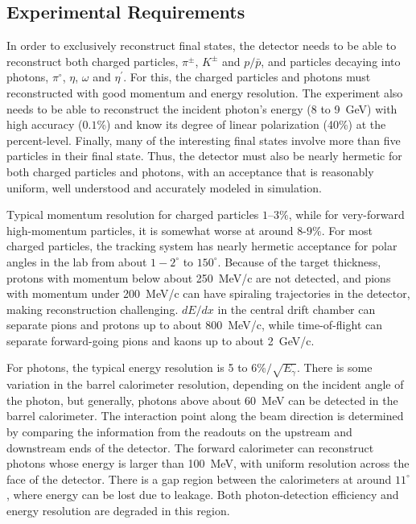 \subsection[Experimental Requirements]{Experimental Requirements \label{sec:intro:requirements}}
In order to exclusively reconstruct final states, the \gx{} detector needs to be able to reconstruct both charged particles, $\pi^{\pm}$, $K^{\pm}$ and $p/\bar{p}$, and particles decaying into photons, $\pi^{\circ}$, $\eta$, $\omega$ and $\eta^{\prime}$. For this, the charged particles and photons must reconstructed with good momentum and energy resolution. The experiment also needs to be able to reconstruct the incident photon's energy (8 to 9~GeV) with high accuracy ($0.1$\%) and know its degree of linear polarization (40\%) at the percent-level. Finally, many of the interesting final states involve more than five particles in their final state. Thus, the \gx{} detector must also be nearly hermetic for both charged particles and photons, with an acceptance that is reasonably uniform, well understood and accurately modeled in simulation.

Typical momentum resolution for charged particles $1$--$3\%$, while for very-forward high-momentum particles, it is somewhat worse at around $8$-$9\%$. For most charged particles, the tracking system has nearly hermetic acceptance for polar angles in the lab from about $1-2^{\circ}$ to $150^{\circ}$. Because of the target thickness, protons with momentum below about 250~MeV/c are not detected, and pions with momentum under 200~MeV/c can have spiraling trajectories in the detector, making reconstruction challenging. $dE/dx$ in the central drift chamber can separate pions and protons up to about 800~MeV/c, while time-of-flight can separate forward-going pions and kaons up to about 2~GeV/c.

For photons, the typical energy resolution is 5 to 6\%$/\sqrt{E_{\gamma}}$. There is some variation in the barrel calorimeter resolution, depending on the incident angle of the photon, but generally, photons above about 60~MeV can be detected in the barrel calorimeter. The interaction point along the beam direction is determined by comparing the information from the readouts on the upstream and downstream ends of the detector. The forward calorimeter can reconstruct photons whose energy is larger than 100~MeV, with uniform resolution across the face of the detector. There is a gap region between the calorimeters at around $11^{\circ}$, where energy can be lost due to leakage. Both photon-detection efficiency and energy resolution are degraded in this region. 
 
